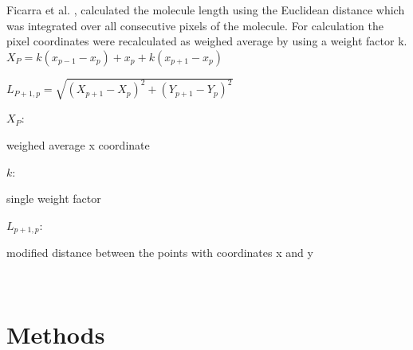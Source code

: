\documentclass{article}
\begin{document}
Ficarra et al. \cite{ficarra2002automated},  \cite{ficarra2005automated} calculated the molecule length using the Euclidean distance which was integrated over all consecutive pixels of the molecule. For calculation the pixel coordinates were recalculated as weighed average by using a weight factor k.\\


$ X_{P} = k(x_{p-1}-x_{p})+x_{p}+k(x_{p+1}-x_{p}) $

$ L_{P+1,p}= \sqrt{(X_{p+1}-X_{p})^{2}+(Y_{p+1}-Y_{p})^{2}} $

\hspace{0,2cm}

$ X_{P} $:\begin{footnotesize}
weighed average x coordinate
\end{footnotesize}

$ k $:\begin{footnotesize} 
single weight factor
\end{footnotesize}

$ L_{p+1,p} $:\begin{footnotesize} 
modified distance between the points with coordinates x and y
\end{footnotesize}\\




\section{Methods}\label{sec:Methods}
\end{document}
